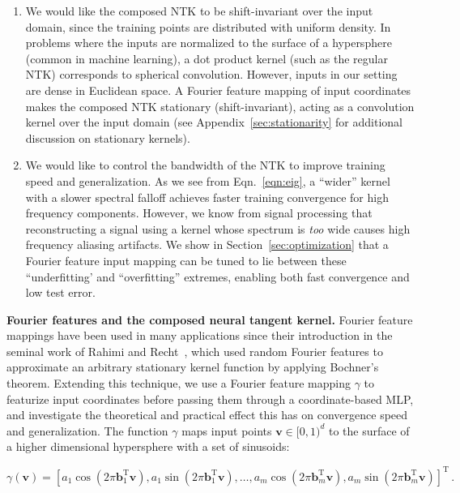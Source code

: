 \begin{enumerate}[leftmargin=*]
    \item We would like the composed NTK to be shift-invariant over the input domain, since the training points are distributed with uniform density. In problems where the inputs are normalized to the surface of a hypersphere (common in machine learning), a dot product kernel (such as the regular NTK) corresponds to spherical convolution. However, inputs in our setting are dense in Euclidean space. A Fourier feature mapping of input coordinates makes the composed NTK stationary (shift-invariant), acting as a convolution kernel over the input domain (see Appendix~\ref{sec:stationarity} for additional discussion on stationary kernels).
    \item We would like to control the bandwidth of the NTK to improve training speed and generalization. As we see from Eqn.~\ref{eqn:eig}, a ``wider'' kernel with a slower spectral falloff achieves faster training convergence for high frequency components. However, we know from signal processing that reconstructing a signal using a kernel whose spectrum is \emph{too} wide causes high frequency aliasing artifacts. We show in Section~\ref{sec:optimization} that a Fourier feature input mapping can be tuned to lie between these ``underfitting' and ``overfitting'' extremes, enabling both fast convergence and low test error. 
\end{enumerate}

{\bf Fourier features and the composed neural tangent kernel.} Fourier feature mappings have been used in many applications since their introduction in the seminal work of Rahimi and Recht~\cite{rahimi2007}, which used random Fourier features to approximate an arbitrary stationary kernel function by applying Bochner's theorem. Extending this technique, we use a Fourier feature mapping $\gamma$ to featurize input coordinates before passing them through a coordinate-based MLP, and investigate the theoretical and practical effect this has on convergence speed and generalization. The function $\gamma$ maps input points $\mathbf{v} \in [0,1)^d$ to the surface of a higher dimensional hypersphere with a set of sinusoids:

\begin{equation}
\label{eqn:gamma}
    \gamma(\mathbf{v}) = \left[
    a_1 \cos(2 \pi \mathbf b_1^\mathrm{T} \mathbf{v}),
    a_1 \sin(2 \pi \mathbf b_1^\mathrm{T} \mathbf{v}), 
    \ldots, 
    a_m \cos(2 \pi \mathbf b_m^\mathrm{T} \mathbf{v}),
    a_m \sin(2 \pi \mathbf b_m^\mathrm{T} \mathbf{v}) \right]^\mathrm{T} \,.
\end{equation}

